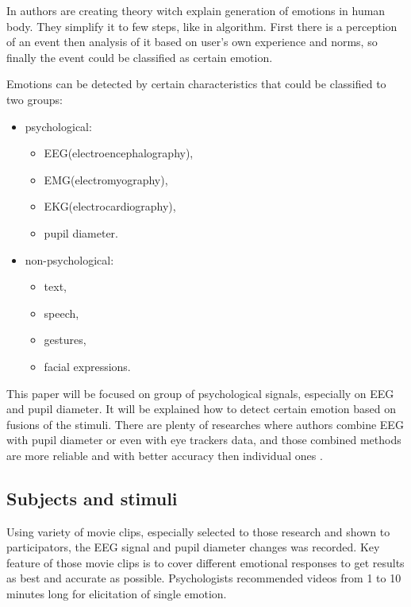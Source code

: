 \documentclass[10pt,journal,compsoc,twoside]{IEEEtran}
\begin{document}
In \cite{OrtonyCloreCollins1988} authors are creating theory witch explain generation of emotions in human body. They simplify it to few steps, like in algorithm. First there is a perception of an event then analysis of it based on user's own experience and norms, so finally the event could be classified as certain emotion.

Emotions can be detected by certain characteristics that could be classified to two groups:
\begin{itemize}
	\item psychological:
	\begin{itemize}
		\item EEG(electroencephalography),
		\item EMG(electromyography), 
		\item EKG(electrocardiography), 
		\item pupil diameter.
	\end{itemize} 
	\item non-psychological: 
	\begin{itemize} 
		\item text, 
		\item speech,
		\item  gestures, 
		\item facial expressions.
	\end{itemize}
\end{itemize}
This paper will be focused on group of psychological signals, especially on EEG and pupil diameter. It will be explained how to detect certain emotion based on fusions of the stimuli. There are plenty of researches where authors combine EEG with pupil diameter or even with eye trackers data, and those combined methods are more reliable and with better accuracy then individual ones \cite{WeiLongBoNanBaoLiang2014,CalvoDMello2010,SoleymaniPanticPun2002}. 

\subsection{Subjects and stimuli}
Using variety of movie clips, especially selected to those research and shown to participators, the EEG signal and pupil diameter changes was recorded. Key feature of those movie clips is to cover different emotional responses to get results as best and accurate as possible. Psychologists recommended videos from 1 to 10 minutes long for elicitation of single emotion\cite{SchaeferNilsSanchezPhilippot2010}.
\end{document}
